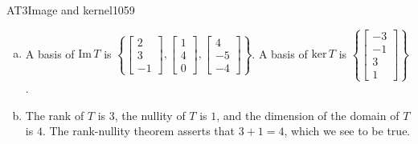 \begin{exercise}{AT3}{Image and kernel}{1059}
\begin{exerciseAnswer}
\begin{enumerate}[(a)]
 
\item  

 A basis of \(\mathrm{Im}\,T\) is \(\left\{ \left[\begin{array}{c}
2 \\
3 \\
-1
\end{array}\right] , \left[\begin{array}{c}
1 \\
4 \\
0
\end{array}\right] , \left[\begin{array}{c}
4 \\
-5 \\
-4
\end{array}\right] \right\}\). A basis of \(\mathrm{ker}\,T\) is \(\left\{ \left[\begin{array}{c}
-3 \\
-1 \\
3 \\
1
\end{array}\right] \right\}\). 

 
\item  

 The rank of \(T\) is \(3\), the nullity of \(T\) is \(1\), and the dimension of the domain of \(T\) is \(4\). The rank-nullity theorem asserts that \(3+1=4\), which we see to be true. 

 
\end{enumerate}

     \end{exerciseAnswer}
 \end{exercise}


